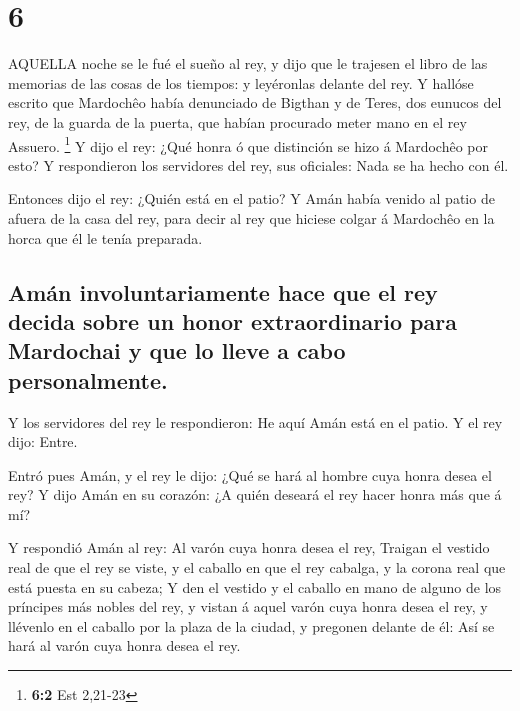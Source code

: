 \hypertarget{section-5}{%
\section{6}\label{section-5}}

 AQUELLA noche se le fué el sueño al rey, y dijo que le
trajesen el libro de las memorias de las cosas de los tiempos: y
leyéronlas delante del rey.  Y hallóse escrito que Mardochêo
había denunciado de Bigthan y de Teres, dos eunucos del rey, de la
guarda de la puerta, que habían procurado meter mano en el rey Assuero.
\footnote{\textbf{6:2} Est 2,21-23}  Y dijo el rey: ¿Qué
honra ó que distinción se hizo á Mardochêo por esto? Y respondieron los
servidores del rey, sus oficiales: Nada se ha hecho con él.

 Entonces dijo el rey: ¿Quién está en el patio? Y Amán había
venido al patio de afuera de la casa del rey, para decir al rey que
hiciese colgar á Mardochêo en la horca que él le tenía preparada.

\hypertarget{amuxe1n-involuntariamente-hace-que-el-rey-decida-sobre-un-honor-extraordinario-para-mardochai-y-que-lo-lleve-a-cabo-personalmente.}{%
\subsection{Amán involuntariamente hace que el rey decida sobre un honor
extraordinario para Mardochai y que lo lleve a cabo
personalmente.}\label{amuxe1n-involuntariamente-hace-que-el-rey-decida-sobre-un-honor-extraordinario-para-mardochai-y-que-lo-lleve-a-cabo-personalmente.}}

 Y los servidores del rey le respondieron: He aquí Amán está
en el patio. Y el rey dijo: Entre.

 Entró pues Amán, y el rey le dijo: ¿Qué se hará al hombre
cuya honra desea el rey? Y dijo Amán en su corazón: ¿A quién deseará el
rey hacer honra más que á mí?

 Y respondió Amán al rey: Al varón cuya honra desea el rey,
 Traigan el vestido real de que el rey se viste, y el
caballo en que el rey cabalga, y la corona real que está puesta en su
cabeza;  Y den el vestido y el caballo en mano de alguno de
los príncipes más nobles del rey, y vistan á aquel varón cuya honra
desea el rey, y llévenlo en el caballo por la plaza de la ciudad, y
pregonen delante de él: Así se hará al varón cuya honra desea el rey.


